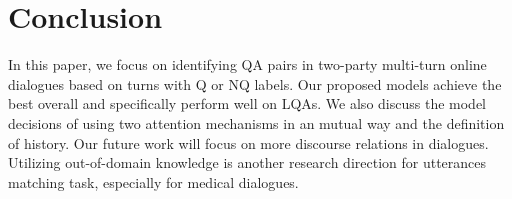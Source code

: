 \section{Conclusion}
\label{sec:conclusion}
In this paper, we focus on identifying QA pairs in two-party multi-turn online dialogues based on turns with Q or NQ labels. Our proposed models achieve the best overall and specifically perform well on LQAs. We also discuss the model decisions of using two attention mechanisms in an mutual way and the definition of history. Our future work will focus on more discourse relations in dialogues. Utilizing out-of-domain knowledge is another research direction for utterances matching task, especially for medical dialogues.

